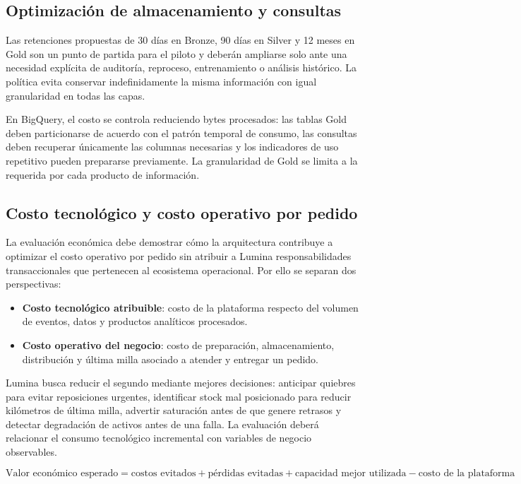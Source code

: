 \documentclass[11pt,a4paper]{article}
\begin{document}
\subsection*{Optimización de almacenamiento y consultas}
Las retenciones propuestas de 30 días en Bronze, 90 días en Silver y 12 meses en Gold son un punto de partida para el piloto y deberán ampliarse solo ante una necesidad explícita de auditoría, reproceso, entrenamiento o análisis histórico. La política evita conservar indefinidamente la misma información con igual granularidad en todas las capas.

En BigQuery, el costo se controla reduciendo bytes procesados: las tablas Gold deben particionarse de acuerdo con el patrón temporal de consumo, las consultas deben recuperar únicamente las columnas necesarias y los indicadores de uso repetitivo pueden prepararse previamente. La granularidad de Gold se limita a la requerida por cada producto de información.

\subsection*{Costo tecnológico y costo operativo por pedido}
La evaluación económica debe demostrar cómo la arquitectura contribuye a optimizar el costo operativo por pedido sin atribuir a Lumina responsabilidades transaccionales que pertenecen al ecosistema operacional. Por ello se separan dos perspectivas:

\begin{itemize}
  \item \textbf{Costo tecnológico atribuible}: costo de la plataforma respecto del volumen de eventos, datos y productos analíticos procesados.
  \item \textbf{Costo operativo del negocio}: costo de preparación, almacenamiento, distribución y última milla asociado a atender y entregar un pedido.
\end{itemize}

Lumina busca reducir el segundo mediante mejores decisiones: anticipar quiebres para evitar reposiciones urgentes, identificar stock mal posicionado para reducir kilómetros de última milla, advertir saturación antes de que genere retrasos y detectar degradación de activos antes de una falla. La evaluación deberá relacionar el consumo tecnológico incremental con variables de negocio observables.

\[
\text{Valor económico esperado}
=
\text{costos evitados}
+
\text{pérdidas evitadas}
+
\text{capacidad mejor utilizada}
-
\text{costo de la plataforma}
\]
\end{document}
